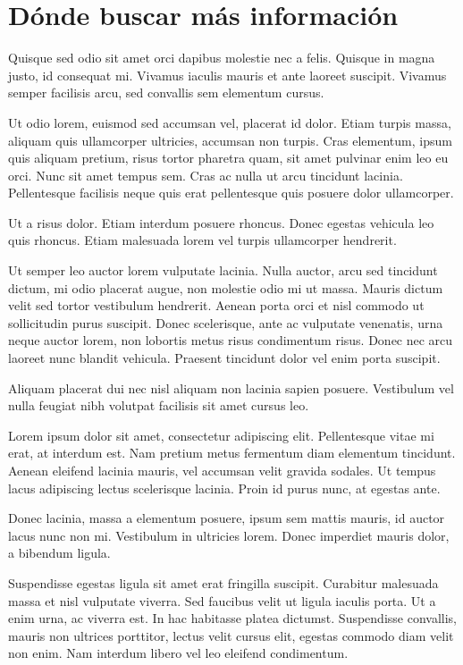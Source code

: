 \documentclass[12pt,a4paper]{report}
\begin{document}
\section{Dónde buscar más información}
\label{seccion.buscarmas}



Quisque sed odio sit amet orci dapibus molestie nec a felis. Quisque in magna justo, id consequat mi. Vivamus iaculis mauris et ante laoreet suscipit. Vivamus semper facilisis arcu, sed convallis sem elementum cursus. 

Ut odio lorem, euismod sed accumsan vel, placerat id dolor. Etiam turpis massa, aliquam quis ullamcorper ultricies, accumsan non turpis. Cras elementum, ipsum quis aliquam pretium, risus tortor pharetra quam, sit amet pulvinar enim leo eu orci. Nunc sit amet tempus sem. Cras ac nulla ut arcu tincidunt lacinia. Pellentesque facilisis neque quis erat pellentesque quis posuere dolor ullamcorper. 

Ut a risus dolor. Etiam interdum posuere rhoncus. Donec egestas vehicula leo quis rhoncus. Etiam malesuada lorem vel turpis ullamcorper hendrerit.

Ut semper leo auctor lorem vulputate lacinia. Nulla auctor, arcu sed tincidunt dictum, mi odio placerat augue, non molestie odio mi ut massa. Mauris dictum velit sed tortor vestibulum hendrerit. Aenean porta orci et nisl commodo ut sollicitudin purus suscipit. Donec scelerisque, ante ac vulputate venenatis, urna neque auctor lorem, non lobortis metus risus condimentum risus. Donec nec arcu laoreet nunc blandit vehicula. Praesent tincidunt dolor vel enim porta suscipit. 

Aliquam placerat dui nec nisl aliquam non lacinia sapien posuere. Vestibulum vel nulla feugiat nibh volutpat facilisis sit amet cursus leo.

Lorem ipsum dolor sit amet, consectetur adipiscing elit. Pellentesque vitae mi erat, at interdum est. Nam pretium metus fermentum diam elementum tincidunt. Aenean eleifend lacinia mauris, vel accumsan velit gravida sodales. Ut tempus lacus adipiscing lectus scelerisque lacinia. Proin id purus nunc, at egestas ante. 

Donec lacinia, massa a elementum posuere, ipsum sem mattis mauris, id auctor lacus nunc non mi. Vestibulum in ultricies lorem. Donec imperdiet mauris dolor, a bibendum ligula.

Suspendisse egestas ligula sit amet erat fringilla suscipit. Curabitur malesuada massa et nisl vulputate viverra. Sed faucibus velit ut ligula iaculis porta. Ut a enim urna, ac viverra est. In hac habitasse platea dictumst. Suspendisse convallis, mauris non ultrices porttitor, lectus velit cursus elit, egestas commodo diam velit non enim. Nam interdum libero vel leo eleifend condimentum. 
\end{document}
